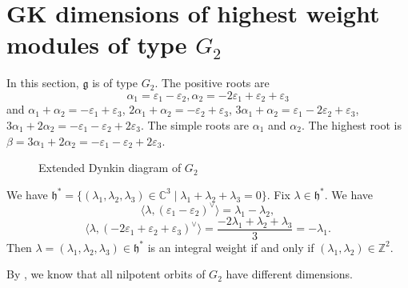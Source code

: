 \documentclass[reqno,12pt]{amsart}
\numberwithin{equation}{section}
\theoremstyle{plain}
\theoremstyle{definition}
\newcommand{\lam}{\lambda}
\newcommand{\ep}{\varepsilon}
\newcommand{\mf}[1]{\mathfrak{#1}}
\newcommand{\bil}[2]{\langle{#1},{#2}^{\vee} \rangle }
\newcommand{\hs}{ \mathfrak{h}^*}
\begin{document}
\section{GK dimensions of  highest weight modules of type \texorpdfstring{$G_2$}{}}\label{g2-gkd}




In this section, $ \mf{g} $ is of type $ G_2 $. The positive roots are \[
\alpha_1=\ep_1-\ep_2, \alpha_2=-2\ep_1+\ep_2+\ep_3
\]
and $ \alpha_1+\alpha_2=-\ep_1+\ep_3 $, $ 2\alpha_1+\alpha_2=-\ep_2+\ep_3 $, $ 3\alpha_1+\alpha_2=\ep_1-2\ep_2 +\ep_3 $, $ 3\alpha_1+2\alpha_2=-\ep_1-\ep_2+2\ep_3 $. The simple roots are $ \alpha_1 $ and $ \alpha_2 $. The highest root is $\beta=3\alpha_1+2\alpha_2=-\ep_1-\ep_2+2\ep_3.$ 



\begin{figure}[htpb]
	\centering 
	\caption{Extended Dynkin diagram of $ G_2 $ }
	\label{dg2}
\end{figure}









We have $ \hs=\{ (\lam_1,\lam_2,\lam_3)\in\mathbb{C}^3\mid \lam_1+\lam_2+\lam_3 =0\} $. Fix $ \lam\in\hs $. We have \[
\bil{\lam}{(\ep_1- \ep_2)}=\lam_1- \lam_2,
\]
\[
\bil{\lam}{(-2\ep_1+\ep_2+\ep_3)}=\frac{-2\lam_1+\lam_2+\lam_3}{3}=-\lam_1.
\]
Then $ \lam=(\lambda_1,\lambda_2,\lambda_3) \in \mathfrak{h}^*$ is an integral weight if and only if $ (\lam_1,\lam_2)\in\mathbb{Z}^2 $.

By \cite[p. 128]{CM}, we know that all nilpotent orbits of $G_2$ have different dimensions.
\end{document}
